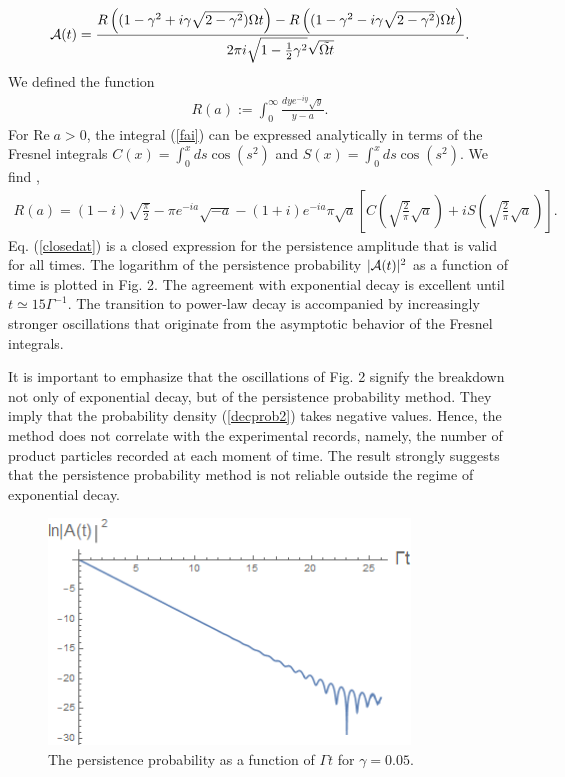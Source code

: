 \documentclass[12pt]{article}
\numberwithin{equation}{section}
\begin{document}
\begin{eqnarray}
{\cal A}(t) = \frac{R\left(  (1- \gamma^2 + i \gamma\sqrt{2-\gamma^2})\Omega t\right) - R\left(  (1- \gamma^2 - i \gamma\sqrt{2-\gamma^2})\Omega t\right)}{2\pi i\sqrt{1 - \frac{1}{2} \gamma^2}\sqrt{\tilde{\Omega t}}}.
\end{eqnarray}
We defined the function
\begin{eqnarray}
R(a) := \int_0^{\infty} \frac{dy e^{-iy}\sqrt{y}} {y - a}. \label{fai}
\end{eqnarray}
For $\mbox{Re} \; a > 0$, the integral (\ref{fai})  can be expressed analytically in terms of the Fresnel integrals $C(x) = \int_0^x ds \cos(s^2)$ and $S(x) =  \int_0^x ds \cos(s^2)$. We find \cite{ASt},
\begin{eqnarray}
R(a) = (1-i) \sqrt{\frac{\pi }{2}}-\pi  e^{-i a} \sqrt{-a}-(1+i)e^{-i a}\pi \sqrt{a}\left[C\left(\sqrt{\frac{2}{\pi }} \sqrt{a}\right)+i S\left(\sqrt{\frac{2}{\pi }} \sqrt{a}\right)\right]. \label{closedat}
\end{eqnarray}
Eq. (\ref{closedat}) is a closed expression for the persistence amplitude that is valid for all times. The logarithm of the persistence probability $|{\cal A}(t)|^2$ as a function of time is plotted in Fig. 2. The agreement with exponential decay is excellent until $t \simeq 15 \Gamma^{-1}$. The transition to power-law decay is accompanied by increasingly stronger oscillations that originate from the asymptotic behavior of the Fresnel integrals.

It is important to emphasize that the oscillations of Fig. 2 signify the breakdown not only of exponential decay, but of the  persistence probability method. They imply that the probability density (\ref{decprob2}) takes negative values. Hence, the   method does not correlate with the experimental records, namely, the number of product particles recorded at each moment of time. The result strongly suggests that the persistence probability method is not reliable outside the regime of exponential decay.

\begin{figure}
\includegraphics[height=6cm]{per4}
\caption{The persistence probability as a function of $\Gamma t$ for $\gamma = 0.05$. }
\end{figure}
\end{document}
